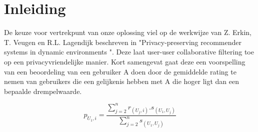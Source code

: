 
\section{Inleiding}
De keuze voor vertrekpunt van onze oplossing viel op de werkwijze van Z. Erkin, T. Veugen en R.L. Lagendijk beschreven in "Privacy-preserving recommender systems in dynamic environments \cite{ZErkinDyn}". Deze laat user-user collaborative filtering toe op een privacyvriendelijke manier. Kort samengevat gaat deze een voorspelling van een beoordeling van een gebruiker A doen door de gemiddelde rating te nemen van gebruikers die een gelijkenis hebben met A die hoger ligt dan een bepaalde drempelwaarde. 

\begin{equation}\label{stdrecom}p_{U_1,i} = \frac{\sum_{j=2}^{n}r_{(U_j,i)}.s_{(U_1,U_j)}}{\sum_{j=2}^{n} s_{(U_1,U_j)}}
\end{equation}
